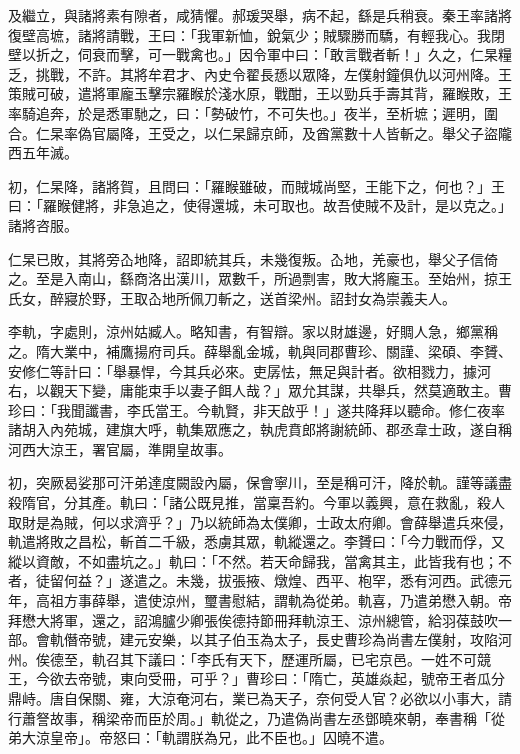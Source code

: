\begin{pinyinscope}
 及繼立，與諸將素有隙者，咸猜懼。郝瑗哭舉，病不起，繇是兵稍衰。秦王率諸將復壁高墌，諸將請戰，王曰：「我軍新恤，銳氣少；賊驟勝而驕，有輕我心。我閉壁以折之，伺衰而擊，可一戰禽也。」因令軍中曰：「敢言戰者斬！」久之，仁杲糧乏，挑戰，不許。其將牟君才、內史令翟長愻以眾降，左僕射鐘俱仇以河州降。王策賊可破，遣將軍龐玉擊宗羅睺於淺水原，戰酣，王以勁兵手壽其背，羅睺敗，王率騎追奔，於是悉軍馳之，曰：「勢破竹，不可失也。」夜半，至析墌；遲明，圍合。仁杲率偽官屬降，王受之，以仁杲歸京師，及酋黨數十人皆斬之。舉父子盜隴西五年滅。



 初，仁杲降，諸將賀，且問曰：「羅睺雖破，而賊城尚堅，王能下之，何也？」王曰：「羅睺健將，非急追之，使得還城，未可取也。故吾使賊不及計，是以克之。」諸將咨服。



 仁杲已敗，其將旁屳地降，詔即統其兵，未幾復叛。屳地，羌豪也，舉父子信倚之。至是入南山，繇商洛出漢川，眾數千，所過剽害，敗大將龐玉。至始州，掠王氏女，醉寢於野，王取屳地所佩刀斬之，送首梁州。詔封女為崇義夫人。



 李軌，字處則，涼州姑臧人。略知書，有智辯。家以財雄邊，好賙人急，鄉黨稱之。隋大業中，補鷹揚府司兵。薛舉亂金城，軌與同郡曹珍、關謹、梁碩、李贇、安修仁等計曰：「舉暴悍，今其兵必來。吏孱怯，無足與計者。欲相戮力，據河右，以觀天下變，庸能束手以妻子餌人哉？」眾允其謀，共舉兵，然莫適敢主。曹珍曰：「我聞讖書，李氏當王。今軌賢，非天啟乎！」遂共降拜以聽命。修仁夜率諸胡入內苑城，建旗大呼，軌集眾應之，執虎賁郎將謝統師、郡丞韋士政，遂自稱河西大涼王，署官屬，準開皇故事。



 初，突厥曷娑那可汗弟達度闕設內屬，保會寧川，至是稱可汗，降於軌。謹等議盡殺隋官，分其產。軌曰：「諸公既見推，當稟吾約。今軍以義興，意在救亂，殺人取財是為賊，何以求濟乎？」乃以統師為太僕卿，士政太府卿。會薛舉遣兵來侵，軌遣將敗之昌松，斬首二千級，悉虜其眾，軌縱還之。李贇曰：「今力戰而俘，又縱以資敵，不如盡坑之。」軌曰：「不然。若天命歸我，當禽其主，此皆我有也；不者，徒留何益？」遂遣之。未幾，拔張掖、燉煌、西平、枹罕，悉有河西。武德元年，高祖方事薛舉，遣使涼州，璽書慰結，謂軌為從弟。軌喜，乃遣弟懋入朝。帝拜懋大將軍，還之，詔鴻臚少卿張俟德持節冊拜軌涼王、涼州總管，給羽葆鼓吹一部。會軌僭帝號，建元安樂，以其子伯玉為太子，長史曹珍為尚書左僕射，攻陷河州。俟德至，軌召其下議曰：「李氏有天下，歷運所屬，已宅京邑。一姓不可競王，今欲去帝號，東向受冊，可乎？」曹珍曰：「隋亡，英雄焱起，號帝王者瓜分鼎峙。唐自保關、雍，大涼奄河右，業已為天子，奈何受人官？必欲以小事大，請行蕭詧故事，稱梁帝而臣於周。」軌從之，乃遣偽尚書左丞鄧曉來朝，奉書稱「從弟大涼皇帝」。帝怒曰：「軌謂朕為兄，此不臣也。」囚曉不遣。




\end{pinyinscope}
